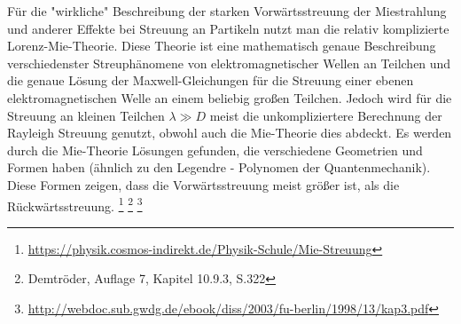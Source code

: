 Für die "wirkliche" Beschreibung der starken Vorwärtsstreuung der Miestrahlung und anderer Effekte bei Streuung an Partikeln nutzt man die relativ komplizierte Lorenz-Mie-Theorie. Diese Theorie ist eine mathematisch genaue Beschreibung verschiedenster Streuphänomene von elektromagnetischer Wellen an Teilchen und die genaue Lösung der Maxwell-Gleichungen für die Streuung einer ebenen elektromagnetischen Welle an einem beliebig großen Teilchen. Jedoch wird für die Streuung an kleinen Teilchen $\lambda\gg D$ meist die unkompliziertere Berechnung der Rayleigh Streuung genutzt, obwohl auch die Mie-Theorie dies abdeckt. Es werden durch die Mie-Theorie Lösungen gefunden, die verschiedene Geometrien und Formen haben (ähnlich zu den Legendre - Polynomen der Quantenmechanik). Diese Formen zeigen, dass die Vorwärtsstreuung meist größer ist, als die Rückwärtsstreuung.
\footnote{\url{https://physik.cosmos-indirekt.de/Physik-Schule/Mie-Streuung}}
\footnote{Demtröder, Auflage 7, Kapitel 10.9.3, S.322}
\footnote{\url{http://webdoc.sub.gwdg.de/ebook/diss/2003/fu-berlin/1998/13/kap3.pdf}}